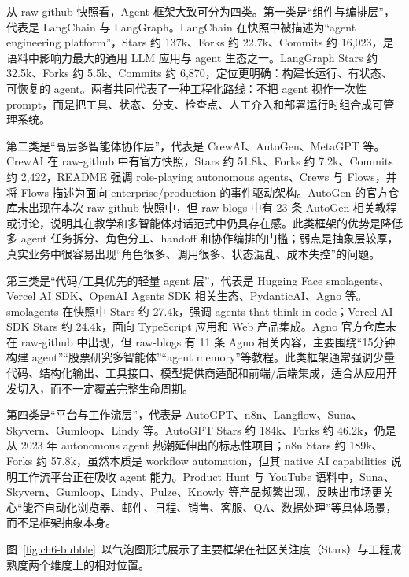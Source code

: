 从 raw-github 快照看，Agent 框架大致可分为四类。第一类是``组件与编排层''，代表是 LangChain 与 LangGraph。LangChain 在快照中被描述为``agent engineering platform''，Stars 约 137k、Forks 约 22.7k、Commits 约 16,023，是语料中影响力最大的通用 LLM 应用与 agent 生态之一。LangGraph Stars 约 32.5k、Forks 约 5.5k、Commits 约 6,870，定位更明确：构建长运行、有状态、可恢复的 agent。两者共同代表了一种工程化路线：不把 agent 视作一次性 prompt，而是把工具、状态、分支、检查点、人工介入和部署运行时组合成可管理系统。

第二类是``高层多智能体协作层''，代表是 CrewAI、AutoGen、MetaGPT 等。CrewAI 在 raw-github 中有官方快照，Stars 约 51.8k、Forks 约 7.2k、Commits 约 2,422，README 强调 role-playing autonomous agents、Crews 与 Flows，并将 Flows 描述为面向 enterprise/production 的事件驱动架构。AutoGen 的官方仓库未出现在本次 raw-github 快照中，但 raw-blogs 中有 23 条 AutoGen 相关教程或讨论，说明其在教学和多智能体对话范式中仍具存在感。此类框架的优势是降低多 agent 任务拆分、角色分工、handoff 和协作编排的门槛；弱点是抽象层较厚，真实业务中很容易出现``角色很多、调用很多、状态混乱、成本失控''的问题。

第三类是``代码/工具优先的轻量 agent 层''，代表是 Hugging Face smolagents、Vercel AI SDK、OpenAI Agents SDK 相关生态、PydanticAI、Agno 等。smolagents 在快照中 Stars 约 27.4k，强调 agents that think in code；Vercel AI SDK Stars 约 24.4k，面向 TypeScript 应用和 Web 产品集成。Agno 官方仓库未在 raw-github 中出现，但 raw-blogs 有 11 条 Agno 相关内容，主要围绕``15分钟构建 agent''``股票研究多智能体''``agent memory''等教程。此类框架通常强调少量代码、结构化输出、工具接口、模型提供商适配和前端/后端集成，适合从应用开发切入，而不一定覆盖完整生命周期。

第四类是``平台与工作流层''，代表是 AutoGPT、n8n、Langflow、Suna、Skyvern、Gumloop、Lindy 等。AutoGPT Stars 约 184k、Forks 约 46.2k，仍是从 2023 年 autonomous agent 热潮延伸出的标志性项目；n8n Stars 约 189k、Forks 约 57.8k，虽然本质是 workflow automation，但其 native AI capabilities 说明工作流平台正在吸收 agent 能力。Product Hunt 与 YouTube 语料中，Suna、Skyvern、Gumloop、Lindy、Pulze、Knowly 等产品频繁出现，反映出市场更关心``能否自动化浏览器、邮件、日程、销售、客服、QA、数据处理''等具体场景，而不是框架抽象本身。

图~\ref{fig:ch6-bubble}~以气泡图形式展示了主要框架在社区关注度（Stars）与工程成熟度两个维度上的相对位置。

